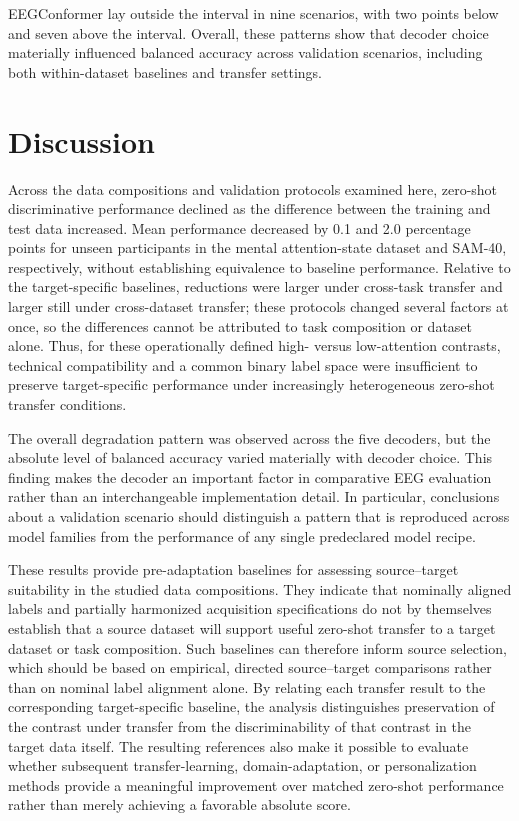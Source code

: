 \documentclass[10pt,letterpaper]{article}
\begin{document}
EEGConformer lay outside the interval in nine scenarios, with two points below
and seven above the interval. Overall, these patterns show that decoder choice
materially influenced balanced accuracy across validation scenarios, including
both within-dataset baselines and transfer settings.

\section*{Discussion}

Across the data compositions and validation protocols examined here, zero-shot
discriminative performance declined as the difference between the training and
test data increased. Mean performance decreased by 0.1 and 2.0 percentage points for unseen
participants in the mental attention-state dataset and SAM-40, respectively,
without establishing equivalence to baseline performance. Relative to the
target-specific baselines, reductions were larger under cross-task transfer and
larger still under cross-dataset transfer; these protocols changed several
factors at once, so the differences cannot be attributed to task composition
or dataset alone. Thus, for these operationally defined high- versus
low-attention contrasts, technical compatibility and a common binary label space
were insufficient to preserve target-specific performance under increasingly
heterogeneous zero-shot transfer conditions.

\medskip

The overall degradation pattern was observed across the five decoders, but the
absolute level of balanced accuracy varied materially with decoder choice.
This finding makes the decoder an important factor in comparative EEG
evaluation rather than an interchangeable implementation detail. In
particular, conclusions about a validation scenario should distinguish a
pattern that is reproduced across model families from the performance of any
single predeclared model recipe.

\medskip

These results provide pre-adaptation baselines for assessing
source--target suitability in the studied data compositions. They indicate that
nominally aligned labels and partially harmonized acquisition specifications do
not by themselves establish that a source dataset will support useful zero-shot
transfer to a target dataset or task composition. Such baselines can therefore
inform source selection, which should be based on empirical, directed
source--target comparisons rather than on nominal label alignment alone. By
relating each transfer result to the corresponding target-specific baseline,
the analysis distinguishes preservation of the contrast under transfer from
the discriminability of that contrast in the target data itself. The resulting
references also make it possible to evaluate whether subsequent
transfer-learning, domain-adaptation, or personalization methods provide a
meaningful improvement over matched zero-shot performance rather than merely
achieving a favorable absolute score.
\end{document}
